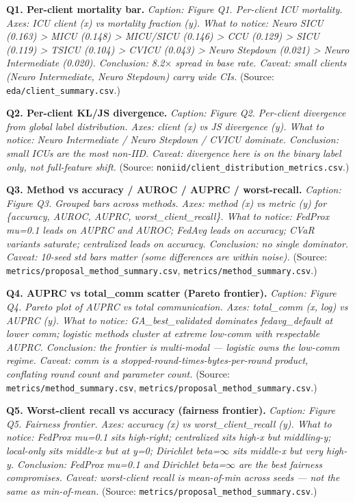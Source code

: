 \documentclass{article}
\begin{document}
\textbf{Q1. Per-client mortality bar.} \emph{Caption: Figure Q1. Per-client ICU mortality. Axes: ICU client (x) vs mortality fraction (y). What to notice: Neuro SICU (0.163) > MICU (0.148) > MICU/SICU (0.146) > CCU (0.129) > SICU (0.119) > TSICU (0.104) > CVICU (0.043) > Neuro Stepdown (0.021) > Neuro Intermediate (0.020). Conclusion: 8.2\ensuremath{\times} spread in base rate. Caveat: small clients (Neuro Intermediate, Neuro Stepdown) carry wide CIs.} (Source: \texttt{eda/client\_summary.csv}.)


\textbf{Q2. Per-client KL/JS divergence.} \emph{Caption: Figure Q2. Per-client divergence from global label distribution. Axes: client (x) vs JS divergence (y). What to notice: Neuro Intermediate / Neuro Stepdown / CVICU dominate. Conclusion: small ICUs are the most non-IID. Caveat: divergence here is on the binary label only, not full-feature shift.} (Source: \texttt{noniid/client\_distribution\_metrics.csv}.)


\textbf{Q3. Method vs accuracy / AUROC / AUPRC / worst-recall.} \emph{Caption: Figure Q3. Grouped bars across methods. Axes: method (x) vs metric (y) for \{accuracy, AUROC, AUPRC, worst\_client\_recall\}. What to notice: FedProx mu=0.1 leads on AUPRC and AUROC; FedAvg leads on accuracy; CVaR variants saturate; centralized leads on accuracy. Conclusion: no single dominator. Caveat: 10-seed std bars matter (some differences are within noise).} (Source: \texttt{metrics/proposal\_method\_summary.csv}, \texttt{metrics/method\_summary.csv}.)


\textbf{Q4. AUPRC vs total\_comm scatter (Pareto frontier).} \emph{Caption: Figure Q4. Pareto plot of AUPRC vs total communication. Axes: total\_comm (x, log) vs AUPRC (y). What to notice: GA\_best\_validated dominates fedavg\_default at lower comm; logistic methods cluster at extreme low-comm with respectable AUPRC. Conclusion: the frontier is multi-modal --- logistic owns the low-comm regime. Caveat: comm is a stopped-round-times-bytes-per-round product, conflating round count and parameter count.} (Source: \texttt{metrics/method\_summary.csv}, \texttt{metrics/proposal\_method\_summary.csv}.)


\textbf{Q5. Worst-client recall vs accuracy (fairness frontier).} \emph{Caption: Figure Q5. Fairness frontier. Axes: accuracy (x) vs worst\_client\_recall (y). What to notice: FedProx mu=0.1 sits high-right; centralized sits high-x but middling-y; local-only sits middle-x but at y=0; Dirichlet beta=\ensuremath{\infty} sits middle-x but very high-y. Conclusion: FedProx mu=0.1 and Dirichlet beta=\ensuremath{\infty} are the best fairness compromises. Caveat: worst-client recall is mean-of-min across seeds --- not the same as min-of-mean.} (Source: \texttt{metrics/proposal\_method\_summary.csv}.)
\end{document}
